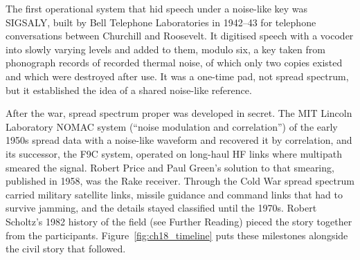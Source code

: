 \begin{history}
The first operational system that hid speech under a noise-like key was SIGSALY, built by
Bell Telephone Laboratories in 1942--43 for telephone conversations between Churchill and
Roosevelt. It digitised speech with a vocoder into slowly varying levels and added to them,
modulo six, a key taken from phonograph records of recorded thermal noise, of which only two
copies existed and which were destroyed after use. It was a one-time pad, not spread
spectrum, but it established the idea of a shared noise-like reference.

After the war, spread spectrum proper was developed in secret. The MIT Lincoln Laboratory
NOMAC system (``noise modulation and correlation'') of the early 1950s spread data with a
noise-like waveform and recovered it by correlation, and its successor, the F9C system,
operated on long-haul HF links where multipath smeared the signal. Robert Price and Paul
Green's solution to that smearing, published in 1958, was the Rake receiver. Through the Cold
War spread spectrum carried military satellite links, missile guidance and command links
that had to survive jamming, and the details stayed classified until the 1970s. Robert
Scholtz's 1982 history of the field (see Further Reading) pieced the story together from the
participants. Figure~\ref{fig:ch18_timeline} puts these milestones alongside the civil story that
followed.
\end{history}

